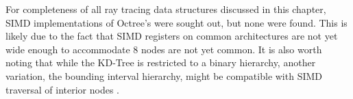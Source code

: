 For completeness of all ray tracing data structures discussed in this chapter,
SIMD implementations of Octree's were sought out, but none were found. This is
likely due to the fact that SIMD registers on common architectures are not yet
wide enough to accommodate 8 nodes are not yet common. It is also worth noting
that while the KD-Tree is restricted to a binary hierarchy, another variation,
the bounding interval hierarchy, might be compatible with SIMD traversal of
interior nodes \cite{Watcher_2006}.

